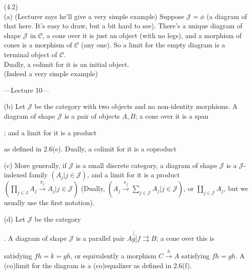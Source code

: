 \documentclass[a4paper]{article}
\begin{document}
\begin{eg} (4.2)\\
    (a) (Lecturer says he'll give a very simple example) Suppose $\mathcal{J} = \phi$ (a diagram of that here. It's easy to draw, but a bit hard to see). There's a unique diagram of shape $\mathcal{J}$ in $\mathcal{C}$, a cone over it is just an object (with no legs), and a morphism of cones is a morphism of $\mathcal{C}$ (any one). So a limit for the empty diagram is a terminal object of $\mathcal{C}$.\\
    Dually, a colimit for it is an initial object.\\
    (Indeed a very simple example)

    ---Lecture 10---

    (b) Let $\mathcal{J}$ be the category with two objects and no non-identity morphisms. A diagram of shape $\mathcal{J}$ is a pair of objects $A,B$; a cone over it is a span
    ; and a limit for it is a product
    as defined in 2.6(e). Dually, a colimit for it is a coproduct 

    (c) More generally, if $\mathcal{J}$ is a small discrete category, a diagram of shape $\mathcal{J}$ is a $\mathcal{J}$-indexed family $(A_j|j \in \mathcal{J})$, and a limit for it is a product $(\prod_{j \in J} A_j \xrightarrow{\pi_j} A_j | j \in \mathcal{J})$ (Dually, $(A_j \xrightarrow{\nu_j} \sum_{j \in \mathcal{J}} A_j | j \in \mathcal{J})$, or $\coprod_{j \in \mathcal{J}} A_j$, but we usually use the first notation).

    (d) Let $\mathcal{J}$ be the category 
    . A diagram of shape $\mathcal{J}$ is a parallel pair $A \stackrel[g]{f}{\rightrightarrows} B$; a cone over this is 
    satisfying $fh=k=gh$, or equivalently a morphism $C \xrightarrow{h} A$ satisfying $fh = gh$. A (co)limit for the diagram is a (co)equalizer as defined in 2.6(f).


\end{eg}
\end{document}
